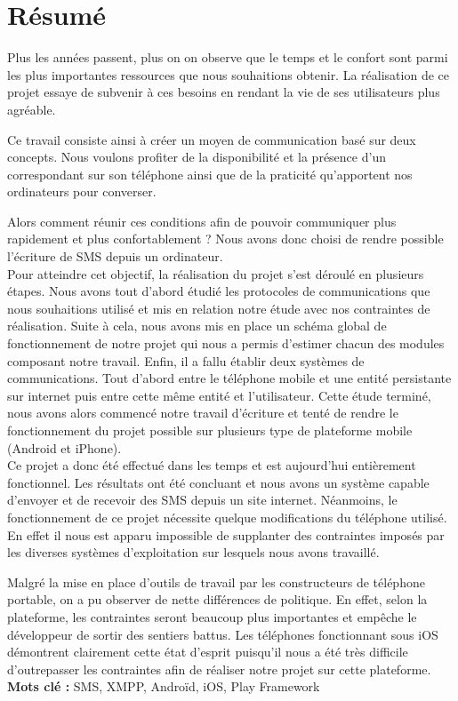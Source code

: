 \cleardoublepage



\chapter*{Résumé}

\thispagestyle{empty}



Plus les années passent, plus on on observe que le temps et le confort sont parmi
les plus importantes ressources que nous souhaitions obtenir. La réalisation de ce
projet essaye de subvenir à ces besoins en rendant la vie de ses utilisateurs plus agréable.

Ce travail consiste ainsi à créer un moyen de communication basé sur deux concepts.
Nous voulons profiter de la disponibilité et la présence d'un correspondant sur son 
téléphone ainsi que de la praticité qu'apportent nos ordinateurs pour converser.

Alors comment réunir ces conditions afin de pouvoir communiquer plus rapidement et plus confortablement ?
Nous avons donc choisi de rendre possible l'écriture de SMS depuis un ordinateur.
\\


Pour atteindre cet objectif, la réalisation du projet s'est déroulé en plusieurs étapes.
Nous avons tout d'abord étudié les protocoles de communications que nous souhaitions utilisé
et mis en relation notre étude avec nos contraintes de réalisation. Suite à cela, nous avons
mis en place un schéma global de fonctionnement de notre projet qui nous a permis d'estimer
chacun des modules composant notre travail. Enfin, il a fallu établir deux systèmes de communications.
Tout d'abord entre le téléphone mobile et une entité persistante sur internet puis entre
cette même entité et l'utilisateur. Cette étude terminé, nous avons alors commencé notre
travail d'écriture et tenté de rendre le fonctionnement du projet possible sur plusieurs
type de plateforme mobile (Android et iPhone).
\\


Ce projet a donc été effectué dans les temps et est aujourd'hui entièrement fonctionnel.
Les résultats ont été concluant et nous avons un système capable d'envoyer et de recevoir
des SMS depuis un site internet. Néanmoins, le fonctionnement de ce projet nécessite quelque 
modifications du téléphone utilisé. En effet il nous est apparu impossible de supplanter
des contraintes imposés par les diverses systèmes d'exploitation sur lesquels nous avons travaillé.

Malgré la mise en place d'outils de travail par les constructeurs de téléphone portable,
on a pu observer de nette différences de politique. En effet, selon la plateforme, les contraintes
seront beaucoup plus importantes et empêche le développeur de sortir des sentiers battus. 
Les téléphones fonctionnant sous iOS démontrent clairement cette état d'esprit puisqu'il 
nous a été très difficile d'outrepasser les contraintes afin de réaliser notre projet sur cette plateforme.
\\



\textbf{Mots clé : }
SMS, XMPP, Androïd, iOS, Play Framework